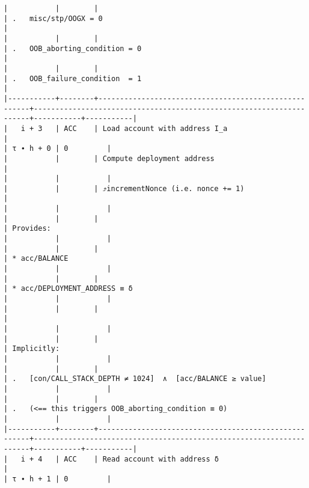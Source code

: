 \documentclass[varwidth=\maxdimen,margin=0.5cm,multi={verbatim}]{standalone}
\begin{document}
\begin{verbatim}
|           |        |                                                      | .   misc/stp/OOGX = 0                                               |
|           |        |                                                      | .   OOB_aborting_condition = 0                                      |
|           |        |                                                      | .   OOB_failure_condition  = 1                                      |
|-----------+--------+------------------------------------------------------+---------------------------------------------------------------------+-----------+-----------|
|   i + 3   | ACC    | Load account with address I_a                        |                                                                     | τ ∙ h + 0 | 0         |
|           |        | Compute deployment address                           |                                                                     |           |           |
|           |        | ⤴️incrementNonce (i.e. nonce += 1)                    |                                                                     |           |           |
|           |        |                                                      | Provides:                                                           |           |           |
|           |        |                                                      | * acc/BALANCE                                                       |           |           |
|           |        |                                                      | * acc/DEPLOYMENT_ADDRESS ≡ δ                                        |           |           |
|           |        |                                                      |                                                                     |           |           |
|           |        |                                                      | Implicitly:                                                         |           |           |
|           |        |                                                      | .   [con/CALL_STACK_DEPTH ≠ 1024]  ∧  [acc/BALANCE ≥ value]         |           |           |
|           |        |                                                      | .   (<== this triggers OOB_aborting_condition ≡ 0)                  |           |           |
|-----------+--------+------------------------------------------------------+---------------------------------------------------------------------+-----------+-----------|
|   i + 4   | ACC    | Read account with address δ                          |                                                                     | τ ∙ h + 1 | 0         |

\end{verbatim}
\end{document}
